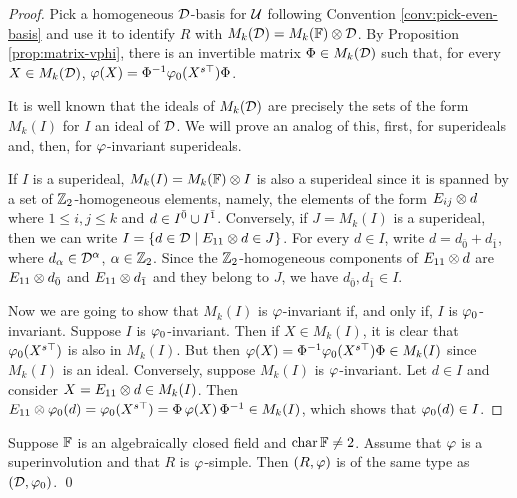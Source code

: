 \begin{proof}
    Pick a homogeneous $\mathcal{D}$-basis for $\mathcal U$ following Convention \ref{conv:pick-even-basis} and use it to identify $R$ with $M_k(\mathcal{D}) = M_k(\mathbb{F}) \otimes \mathcal{D}$. 
    By Proposition \ref{prop:matrix-vphi}, there is an invertible matrix $\Phi \in M_k(\mathcal{D})$ such that, for every $X \in M_k(\mathcal{D})$,
    $\varphi(X) = \Phi^{-1} \varphi_0(X^{s\top}) \Phi$.
    
    It is well known that the ideals of $M_k(\mathcal{D})$ are precisely the sets of the form $M_k(I)$ for $I$ an ideal of $\mathcal{D}$. 
    We will prove an analog of this, first, for superideals and, then, for $\varphi$-invariant superideals.
    
    If $I$ is a superideal, $M_k(I) = M_k(\mathbb{F}) \otimes I$ is also a superideal since it is spanned by a set of $\mathbb{Z}_2$-homogeneous elements, namely, the elements of the form $E_{ij}\otimes d$ where $1 \leq i,j \leq k$ and $d \in I^{\bar0} \cup I^{\bar1}$. 
    Conversely, if $J = M_k(I)$ is a superideal, then we can write $I = \{ d\in  \mathcal{D} \mid E_{11}\otimes d \in J\}$. 
    For every $d\in I$, write $d = d_{\bar 0} + d_{\bar 1}$, where $d_\alpha \in \mathcal{D}^\alpha$, $\alpha \in \mathbb{Z}_2$. 
    Since the $\mathbb{Z}_2$-homogeneous components of $E_{11}\otimes d$ are $E_{11}\otimes d_{\bar 0}$ and $E_{11}\otimes d_{\bar 1}$ and they belong to $J$, we have $d_{\bar 0}, d_{\bar 1} \in I$.
    
    Now we are going to show that $M_k(I)$ is $\varphi$-invariant if, and only if, $I$ is $\varphi_0$-invariant. 
    Suppose $I$ is $\varphi_0$-invariant.
    Then if $X \in M_k(I)$, it is clear that $\varphi_0 (X^{s\top})$ is also in $M_k(I)$. 
    But then $\varphi(X) = \Phi^{-1} \varphi_0(X^{s\top}) \Phi \in M_k(I)$ since $M_k(I)$ is an ideal. 
    Conversely, suppose $M_k(I)$ is $\varphi$-invariant. 
    Let $d \in I$ and consider $X = E_{11} \otimes d \in M_k(I)$.
    Then $E_{11} \otimes \varphi_0(d) = \varphi_0(X^{s\top}) = \Phi\, \varphi(X)\, \Phi^{-1} \in M_k(I)$, which shows that $\varphi_0(d) \in I$.
\end{proof}

\begin{cor}\label{cor:D-has-the-same-type}
    Suppose $\mathbb{F}$ is an algebraically closed field and $\operatorname{char} \mathbb{F} \neq 2$. 
    Assume that $\varphi$ is a superinvolution and that $R$ is $\varphi$-simple. 
    Then $(R, \varphi)$ is of the same type as $(\mathcal{D}, \varphi_0)$. \qed
\end{cor}

